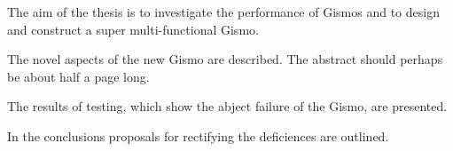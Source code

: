 \abstracttitle
{\singlespacing
The aim of the thesis is to investigate the performance of Gismos and
to design and construct a super multi-functional Gismo.

The novel aspects of the new Gismo are described. The abstract should
perhaps be about half a page long.

The results of testing, which show the abject failure of the Gismo,
are presented.

In the conclusions proposals for rectifying the deficiences are
outlined.
}

